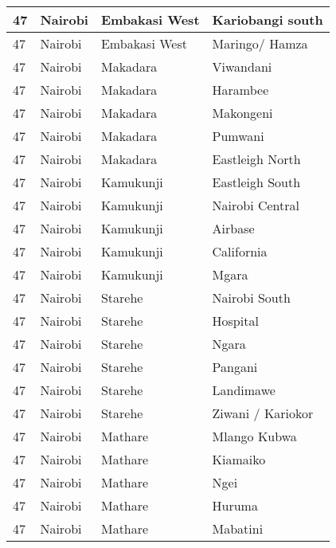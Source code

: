 \begin{table}[!ht]
\begin{tabular}{|l|l|l|l|}
        47 & Nairobi & Embakasi West & Kariobangi south \\ \hline
        47 & Nairobi & Embakasi West & Maringo/ Hamza \\ \hline
        47 & Nairobi & Makadara & Viwandani \\ \hline
        47 & Nairobi & Makadara & Harambee \\ \hline
        47 & Nairobi & Makadara & Makongeni \\ \hline
        47 & Nairobi & Makadara & Pumwani \\ \hline
        47 & Nairobi & Makadara & Eastleigh North \\ \hline
        47 & Nairobi & Kamukunji & Eastleigh South \\ \hline
        47 & Nairobi & Kamukunji & Nairobi Central \\ \hline
        47 & Nairobi & Kamukunji & Airbase \\ \hline
        47 & Nairobi & Kamukunji & California \\ \hline
        47 & Nairobi & Kamukunji & Mgara \\ \hline
        47 & Nairobi & Starehe & Nairobi South \\ \hline
        47 & Nairobi & Starehe & Hospital \\ \hline
        47 & Nairobi & Starehe & Ngara \\ \hline
        47 & Nairobi & Starehe & Pangani \\ \hline
        47 & Nairobi & Starehe & Landimawe \\ \hline
        47 & Nairobi & Starehe & Ziwani / Kariokor \\ \hline
        47 & Nairobi & Mathare & Mlango Kubwa \\ \hline
        47 & Nairobi & Mathare & Kiamaiko \\ \hline
        47 & Nairobi & Mathare & Ngei \\ \hline
        47 & Nairobi & Mathare & Huruma \\ \hline
        47 & Nairobi & Mathare & Mabatini \\ \hline
    \end{tabular}
\end{table}